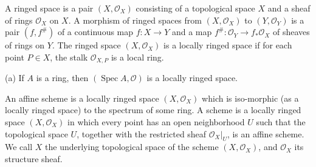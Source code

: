 \begin{definition}
  A ringed space is a pair $\left(X, \mathcal{O}_X\right)$ consisting of a topological space $X$ and a sheaf of rings $\mathcal{O}_X$ on $X$. A morphism of ringed spaces from $\left(X, \mathcal{O}_X\right)$ to $\left(Y, \mathcal{O}_Y\right)$ is a pair $\left(f, f^{\#}\right)$ of a continuous map $f: X \rightarrow Y$ and a map $f^{\#}: \mathcal{O}_Y \rightarrow f_* \mathcal{O}_X$ of sheaves of rings on $Y$. The ringed space $\left(X, \mathcal{O}_X\right)$ is a locally ringed space if for each point $P \in X$, the stalk $\mathcal{O}_{X, P}$ is a local ring.
\end{definition}

\begin{proposition}[][Proposition 2.3]
  (a) If $A$ is a ring, then $(\operatorname{Spec} A, \mathcal{O})$ is a locally ringed space.
\end{proposition}

\begin{definition}
  An affine scheme is a locally ringed space $\left(X, \mathcal{O}_X\right)$ which is iso-morphic (as a locally ringed space) to the spectrum of some ring. A scheme is a locally ringed space $\left(X, \mathcal{O}_X\right)$ in which every point has an open neighborhood $U$ such that the topological space $U$, together with the restricted sheaf $\left.\mathcal{O}_X\right|_U$, is an affine scheme. We call $X$ the underlying topological space of the scheme $\left(X, \mathcal{O}_X\right)$, and $\mathcal{O}_X$ its structure sheaf.
\end{definition} 